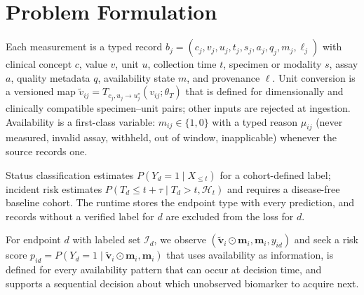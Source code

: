 \section{Problem Formulation}\label{sec:formulation}
Each measurement is a typed record $b_j=(c_j,v_j,u_j,t_j,s_j,a_j,q_j,m_j,\ell_j)$ with clinical concept $c$, value $v$, unit $u$, collection time $t$, specimen or modality $s$, assay $a$, quality metadata $q$, availability state $m$, and provenance $\ell$. Unit conversion is a versioned map $\tilde v_{ij}=T_{c_j,u_j\to u_j^*}(v_{ij};\theta_T)$ that is defined for dimensionally and clinically compatible specimen--unit pairs; other inputs are rejected at ingestion. Availability is a first-class variable: $m_{ij}\in\{1,0\}$ with a typed reason $\mu_{ij}$ (never measured, invalid assay, withheld, out of window, inapplicable) whenever the source records one.

Status classification estimates $P(Y_d=1\mid X_{\le t})$ for a cohort-defined label; incident risk estimates $P(T_d\le t+\tau\mid T_d>t,\mathcal{H}_t)$ and requires a disease-free baseline cohort. The runtime stores the endpoint type with every prediction, and records without a verified label for $d$ are excluded from the loss for $d$.

For endpoint $d$ with labeled set $\mathcal{I}_d$, we observe $(\tilde{\bm v}_i\odot\bm m_i,\bm m_i,y_{id})$ and seek a risk score $p_{id}=P(Y_d=1\mid\tilde{\bm v}_i\odot\bm m_i,\bm m_i)$ that uses availability as information, is defined for every availability pattern that can occur at decision time, and supports a sequential decision about which unobserved biomarker to acquire next.
